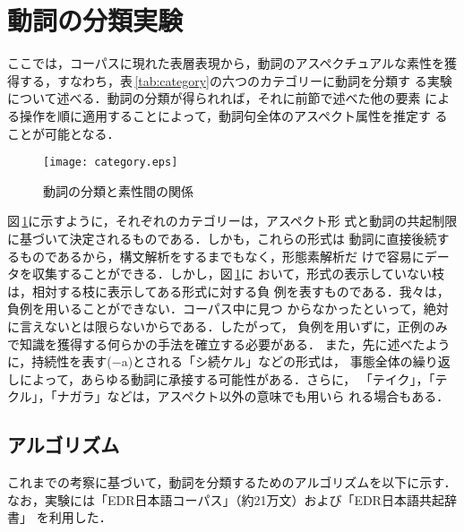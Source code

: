 \section{動詞の分類実験}

ここでは，コーパスに現れた表層表現から，動詞のアスペクチュアルな素性を獲
得する，すなわち，表\,\ref{tab:category}の六つのカテゴリーに動詞を分類す
る実験について述べる．動詞の分類が得られれば，それに前節で述べた他の要素
による操作を順に適用することによって，動詞句全体のアスペクト属性を推定す
ることが可能となる．

\begin{figure}
\begin{center}
	\leavevmode
      	
      	\texttt{[image: category.eps]}
	
\end{center}
\caption{動詞の分類と素性間の関係}
\label{fig:category}
\end{figure}

図\,\ref{fig:category}に示すように，それぞれのカテゴリーは，アスペクト形
式と動詞の共起制限に基づいて決定されるものである．しかも，これらの形式は
動詞に直接後続するものであるから，構文解析をするまでもなく，形態素解析だ
けで容易にデータを収集することができる．しかし，図\,\ref{fig:category}に
おいて，形式の表示していない枝は，相対する枝に表示してある形式に対する負
例を表すものである．我々は，負例を用いることができない．コーパス中に見つ
からなかったといって，絶対に言えないとは限らないからである．したがって，
負例を用いずに，正例のみで知識を獲得する何らかの手法を確立する必要がある．
また，先に述べたように，持続性を表す($-$a)とされる「シ続ケル」などの形式は，
事態全体の繰り返しによって，あらゆる動詞に承接する可能性がある．さらに，
「テイク」，「テクル」，「ナガラ」などは，アスペクト以外の意味でも用いら
れる場合もある．

\subsection{アルゴリズム}

これまでの考察に基づいて，動詞を分類するためのアルゴリズムを以下に示す．
なお，実験には「EDR日本語コーパス」（約21万文）および「EDR日本語共起辞書」
\cite{EDR95aj}を利用した．

